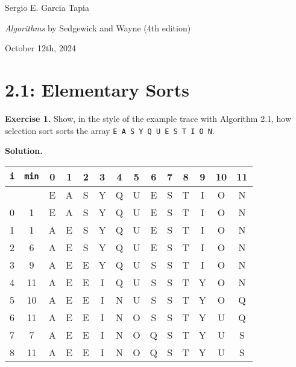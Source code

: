 \documentclass[12pt, a4paper]{article}
\newenvironment{ex}[2][Exercise]
{\par\medskip\noindent \textbf{#1 #2.}}
{\medskip}
\newenvironment{sol}[1][Solution]
{\par\medskip\noindent \textbf{#1.} }
{\medskip}
\begin{document}
	\noindent Sergio E. Garcia Tapia \hfill
	
	\noindent \emph{Algorithms} by Sedgewick and Wayne (4th edition) \cite{sedgewick_wayne}\hfill
	
	\noindent October 12th, 2024\hfill 
	\section*{2.1: Elementary Sorts}
	\begin{ex}{1}
		Show, in the style of the example trace with Algorithm 2.1, how selection sort sorts
		the array \texttt{E A S Y Q U E S T I O N}.
	\end{ex}
	\begin{sol}
		\begin{center}
			\begin{tabular}{cc|cccccccccccc}
				\texttt{i} & \texttt{min} & 0 & 1 & 2 & 3 & 4 & 5 & 6 & 7 & 8 & 9 & 10 & 11 \\
				\hline
				{} & {} & E & A & S & Y & Q & U & E & S & T & I & O & N \\
				0 & 1 & E & {\color{red} A} & S & Y & Q & U & E & S & T & I & O & N\\
				1 & 1 & {\color{gray} A} & {\color{red} E} & S & Y & Q & U & E & S & T & I & O & N \\
				2 & 6 & {\color{gray} A} & {\color{gray} E} & S & Y & Q & U & {\color{red} E} & S & T & I & O & N\\
				3 & 9 & {\color{gray} A} & {\color{gray} E} & {\color{gray} E} & Y & Q & U & S & S & T & {\color{red} I} & O & N\\
				4 & 11 & {\color{gray} A} & {\color{gray} E} & {\color{gray} E} & {\color{gray}I} & Q & U & S & S & T & Y & O & {\color{red} N}\\
				5 & 10 & {\color{gray} A} & {\color{gray} E} & {\color{gray} E} & {\color{gray}I} & {\color{gray} N} & U & S & S & T & Y & {\color{red} O} & Q\\
				6 & 11 & {\color{gray} A} & {\color{gray} E} & {\color{gray} E} & {\color{gray}I} & {\color{gray} N} & {\color{gray}O} & S & S & T & Y & U & {\color{red}Q}\\
				7 & 7 & {\color{gray} A} & {\color{gray} E} & {\color{gray} E} & {\color{gray}I} & {\color{gray} N} & {\color{gray}O} & {\color{gray}Q} & {\color{red}S} & T & Y & U & S\\
				8 & 11 & {\color{gray} A} & {\color{gray} E} & {\color{gray} E} & {\color{gray}I} & {\color{gray} N} & {\color{gray}O} & {\color{gray}Q} & {\color{gray}S} & T & Y & U & {\color{red}S}\\
				

\end{tabular}
\end{center}
\end{sol}
\end{document}
